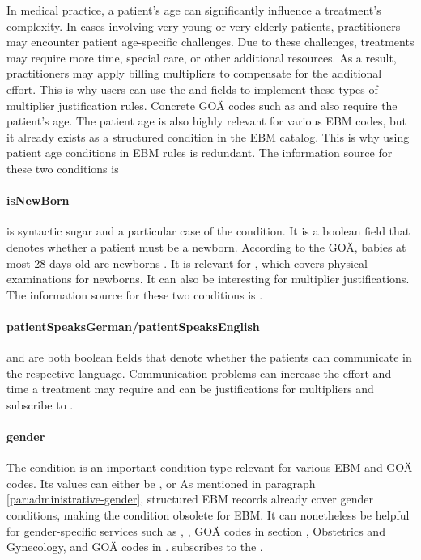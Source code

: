 In medical practice, a patient's age can significantly influence a treatment's complexity.
In cases involving very young or very elderly patients, practitioners may encounter patient age-specific challenges.
Due to these challenges, treatments may require more time, special care, or other additional resources.
As a result, practitioners may apply billing multipliers to compensate for the additional effort.
This is why users can use the \minPatientAge and \maxPatientAge fields to implement these types of multiplier justification rules.
Concrete GOÄ codes such as  and  also require the patient's age.
The patient age is also highly relevant for various EBM codes, but it already exists as a structured condition in the EBM catalog.
This is why using patient age conditions in EBM rules is redundant.
The information source for these two conditions is 


\paragraph{isNewBorn}
\isNewBorn is syntactic sugar and a particular case of the \maxPatientAge condition.
It is a boolean field that denotes whether a patient must be a newborn.
According to the GOÄ, babies at most 28 days old are newborns \cite{bruck1998kommentar}.
It is relevant for , which covers physical examinations for newborns.
It can also be interesting for multiplier justifications.
The information source for these two conditions is .

\paragraph{patientSpeaksGerman/patientSpeaksEnglish}
\patientSpeaksGerman and \patientSpeaksEnglish are both boolean fields that denote whether the patients can communicate in the respective language.
Communication problems can increase the effort and time a treatment may require and can be justifications for multipliers
\patientSpeaksGerman and \patientSpeaksEnglish subscribe to .

\paragraph{gender}
The \gender condition is an important condition type relevant for various EBM and GOÄ codes.
Its values can either be ,  or 
As mentioned in paragraph \ref{par:administrative-gender}, structured EBM records already cover gender conditions, making the \gender condition obsolete for EBM.
It can nonetheless be helpful for gender-specific services such as  , ,  GOÄ codes in section , Obstetrics and Gynecology, and GOÄ codes in .
\gender subscribes to the .
